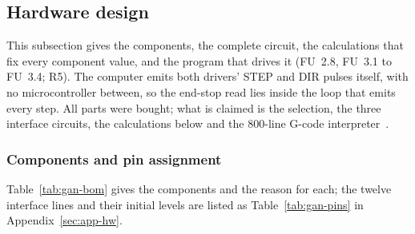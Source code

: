 \subsection{Hardware design}
\label{sec:gantry}

\begingroup
\setlength{\abovedisplayskip}{2pt}\setlength{\belowdisplayskip}{2pt}
\setlength{\abovedisplayshortskip}{1pt}\setlength{\belowdisplayshortskip}{1pt}

This subsection gives the components, the complete circuit, the calculations that fix every component value, and the program that drives it (FU~2.8, FU~3.1 to FU~3.4; R5). The computer emits both drivers' STEP and DIR pulses itself, with no microcontroller between, so the end-stop read lies inside the loop that emits every step. All parts were bought; what is claimed is the selection, the three interface circuits, the calculations below and the 800-line G-code interpreter~\cite{iso6983}.

\subsubsection{Components and pin assignment}
\label{sec:gan-components}

Table~\ref{tab:gan-bom} gives the components and the reason for each; the twelve interface lines and their initial levels are listed as Table~\ref{tab:gan-pins} in Appendix~\ref{sec:app-hw}.

